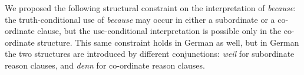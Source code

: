 We proposed the following structural constraint on the interpretation of \textit{because}: the truth-conditional use of \textit{because} may occur in either a subordinate or a co-ordinate clause, but the use-conditional interpretation is possible only in the co-ordinate structure. This same constraint holds in German as well, but in German the two structures are introduced by different conjunctions: \textit{weil} for subordinate reason clauses, and \textit{denn} for co-ordinate reason clauses.




